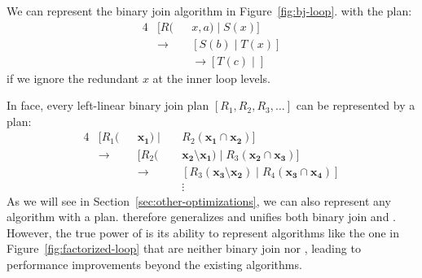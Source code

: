 %
\begin{example}
  We can represent the binary join algorithm in Figure~\ref{fig:bj-loop}.
  with the \FJ plan:
  \begin{alignat*}{4}
     & [R(         &  & x, a) \mid S(x)]        \\
     & \rightarrow &  & [S(b) \mid T(x)]        \\
     &             &  & \rightarrow [T(c) \mid]
  \end{alignat*}
  if we ignore the redundant $x$ at the inner loop levels.
\end{example}
%
In face, every left-linear binary join plan $[R_1, R_2, R_3, \ldots]$
can be represented by a \FJ plan:
\begin{alignat*}{4}
   & [R_1(       &  & \mathbf{x_1}) \mid &  & R_2(\mathbf{\mathbf{x_1} \cap \mathbf{x_2}})]                                      \\
   & \rightarrow &  & [R_2(              &  & \mathbf{x_2} \setminus \mathbf{x_1}) \mid R_3(\mathbf{x_2}\cap \mathbf{x_3})]      \\
   &             &  & \rightarrow        &  & [R_3(\mathbf{x_3} \setminus \mathbf{x_2}) \mid R_4(\mathbf{x_3}\cap \mathbf{x_4})] \\
   &             &  &                    &  & \vdots
\end{alignat*}
%
As we will see in Section~\ref{sec:other-optimizations},
we can also represent any \GJ algorithm with a \FJ plan.
\FJ therefore generalizes and unifies both binary join and \GJ.
However, the true power of \GJ is its ability to represent
algorithms like the one in Figure~\ref{fig:factorized-loop}
that are neither binary join nor \GJ,
leading to performance improvements beyond the existing algorithms.

